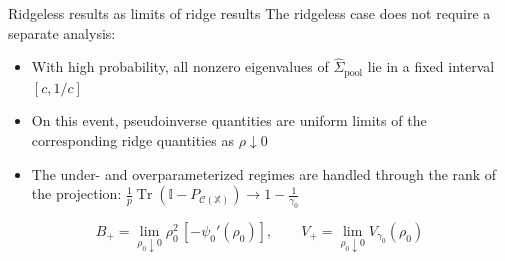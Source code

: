 \documentclass[aspectratio=169,11pt]{beamer}
\newcommand{\Tr}{\operatorname{Tr}}
\newcommand{\X}{\mathbb{X}}
\begin{document}
\begin{frame}{Ridgeless results as limits of ridge results}
  The ridgeless case does not require a separate analysis:
  \begin{itemize}
    \item With high probability, all nonzero eigenvalues of $\widehat\Sigma_{\mathrm{pool}}$ lie in a fixed interval $[c, 1/c]$
    \item On this event, pseudoinverse quantities are uniform limits of the corresponding ridge quantities as $\rho \downarrow 0$
    \item The under- and overparameterized regimes are handled through the rank of the projection: $\tfrac1p\Tr(\mathbb{I} - P_{\mathcal{C}(\X)}) \to 1 - \tfrac{1}{\gamma_0}$
  \end{itemize}
  \vspace{2mm}
  \[
    B_+ = \lim_{\rho_0 \downarrow 0} \rho_0^2\,[-\psi_0'(\rho_0)],
    \qquad
    V_+ = \lim_{\rho_0 \downarrow 0} V_{\gamma_0}(\rho_0)
  \]
\end{frame}
\end{document}
